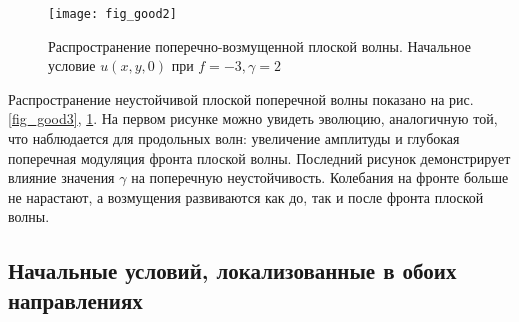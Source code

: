 \begin{figure}
	\centering
	\texttt{[image: fig\_good2]}
	\caption{Распространение поперечно-возмущенной плоской волны. Начальное условие $u(x,y,0)$ при $f = -3, \gamma = 2$} \label{fig_good2}
\end{figure}

Распространение неустойчивой плоской поперечной волны показано на рис.~ \ref {fig_good3}, \ref{fig_good2}. На первом рисунке можно увидеть эволюцию, аналогичную той, что наблюдается для продольных волн: увеличение амплитуды и глубокая поперечная модуляция фронта плоской волны. Последний рисунок демонстрирует влияние значения $ \gamma $ на поперечную неустойчивость. Колебания на фронте больше не нарастают, а возмущения развиваются как до, так и после фронта плоской волны.



\subsection{Начальные условий, локализованные в обоих направлениях}

